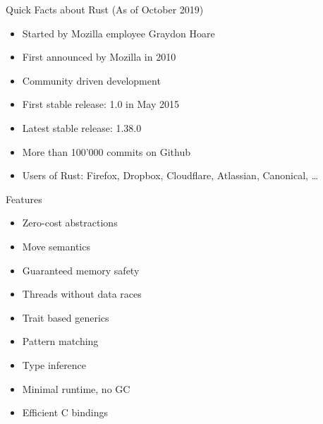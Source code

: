 
\begin{frame}{Quick Facts about Rust}
	(As of October 2019)
	\begin{itemize}
		\item Started by Mozilla employee Graydon Hoare
		\item First announced by Mozilla in 2010
		\item Community driven development
		\item First stable release: 1.0 in May 2015
		\item Latest stable release: 1.38.0
		\item More than 100'000 commits on Github
		\item Users of Rust: Firefox, Dropbox, Cloudflare, Atlassian, Canonical, \ldots
	\end{itemize}
\end{frame}


\begin{frame}{Features}
	\begin{itemize}
		\item Zero-cost abstractions
		\item Move semantics
		\item Guaranteed memory safety
		\item Threads without data races
		\item Trait based generics
		\item Pattern matching
		\item Type inference
		\item Minimal runtime, no GC
		\item Efficient C bindings
	\end{itemize}
\end{frame}
